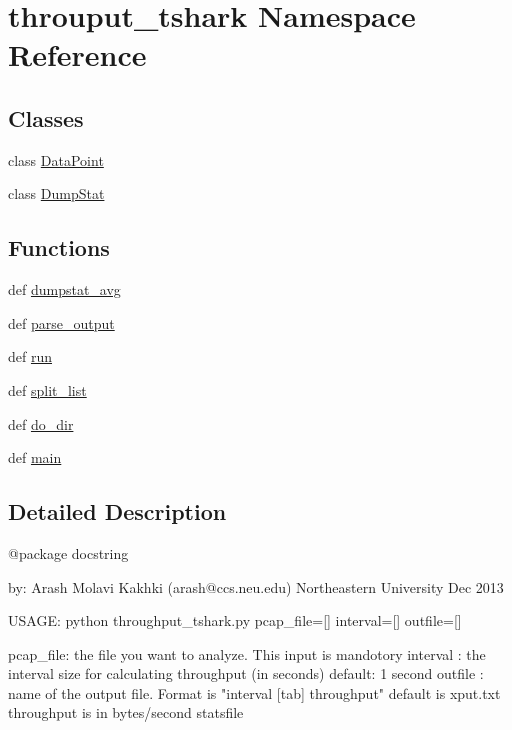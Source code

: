 \hypertarget{namespacethrouput__tshark}{\section{throuput\-\_\-tshark Namespace Reference}
\label{namespacethrouput__tshark}
}
\subsection*{Classes}
\begin{DoxyCompactItemize}
\item 
class \hyperlink{classthrouput__tshark_1_1_data_point}{Data\-Point}
\item 
class \hyperlink{classthrouput__tshark_1_1_dump_stat}{Dump\-Stat}
\end{DoxyCompactItemize}
\subsection*{Functions}
\begin{DoxyCompactItemize}
\item 
def \hyperlink{namespacethrouput__tshark_a7cf943f2dc4fd029521106818dc6f42c}{dumpstat\-\_\-avg}
\item 
def \hyperlink{namespacethrouput__tshark_aadae1a38443951d84893a766c7544c4e}{parse\-\_\-output}
\item 
def \hyperlink{namespacethrouput__tshark_ad87e88509990133de6a38df4742dc876}{run}
\item 
def \hyperlink{namespacethrouput__tshark_ab46319be4c40947f3596aee776407a83}{split\-\_\-list}
\item 
def \hyperlink{namespacethrouput__tshark_a61c2eee9729017b8321509878cca8153}{do\-\_\-dir}
\item 
def \hyperlink{namespacethrouput__tshark_a37360c9b79c8d4a0bc29f07bf195a3b2}{main}
\end{DoxyCompactItemize}


\subsection{Detailed Description}
\begin{DoxyVerb}@package docstring

by: Arash Molavi Kakhki (arash@ccs.neu.edu)
Northeastern University
Dec 2013

USAGE:  python throughput_tshark.py pcap_file=[] interval=[] outfile=[]

    pcap_file: the file you want to analyze. This input is mandotory
    interval : the interval size for calculating throughput (in seconds)
               default: 1 second
    outfile  : name of the output file. Format is "interval [tab] throughput"
               default is xput.txt
               throughput is in bytes/second
    statsfile
\end{DoxyVerb}
 

